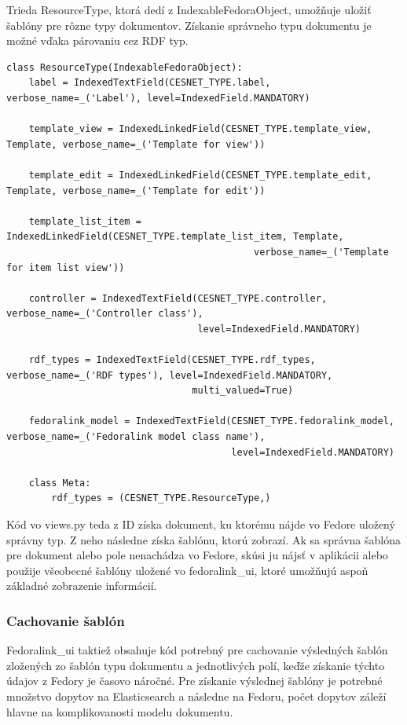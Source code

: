 \documentclass[thesis=M,slovak]{FITthesis}[2013/05/06]
\begin{document}
Trieda ResourceType, ktorá dedí z IndexableFedoraObject, umožňuje uložiť šablóny pre rôzne typy dokumentov. Získanie správneho typu dokumentu je možné vďaka párovaniu cez RDF typ.
\begin{lstlisting}[frame=single] 
class ResourceType(IndexableFedoraObject):
    label = IndexedTextField(CESNET_TYPE.label, verbose_name=_('Label'), level=IndexedField.MANDATORY)

    template_view = IndexedLinkedField(CESNET_TYPE.template_view, Template, verbose_name=_('Template for view'))

    template_edit = IndexedLinkedField(CESNET_TYPE.template_edit, Template, verbose_name=_('Template for edit'))

    template_list_item = IndexedLinkedField(CESNET_TYPE.template_list_item, Template,
                                            verbose_name=_('Template for item list view'))

    controller = IndexedTextField(CESNET_TYPE.controller, verbose_name=_('Controller class'),
                                  level=IndexedField.MANDATORY)

    rdf_types = IndexedTextField(CESNET_TYPE.rdf_types, verbose_name=_('RDF types'), level=IndexedField.MANDATORY,
                                 multi_valued=True)

    fedoralink_model = IndexedTextField(CESNET_TYPE.fedoralink_model, verbose_name=_('Fedoralink model class name'),
                                        level=IndexedField.MANDATORY)

    class Meta:
        rdf_types = (CESNET_TYPE.ResourceType,)
\end{lstlisting}

Kód vo views.py teda z ID získa dokument, ku ktorému nájde vo Fedore uložený správny typ. Z neho následne získa šablónu, ktorú zobrazí. Ak sa správna šablóna pre dokument alebo pole nenachádza vo Fedore, skúsi ju nájsť v aplikácii alebo použije všeobecné šablóny uložené vo fedoralink\_ui, ktoré umožňujú aspoň základné zobrazenie informácií.

\subsubsection{Cachovanie šablón}
Fedoralink\_ui taktiež obsahuje kód potrebný pre cachovanie výsledných šablón zložených zo šablón typu dokumentu a jednotlivých polí, keďže získanie týchto údajov z Fedory je časovo náročné. Pre získanie výslednej šablóny je potrebné množstvo dopytov na Elasticsearch a následne na Fedoru, počet dopytov záleží hlavne na komplikovanosti modelu dokumentu.
\end{document}
